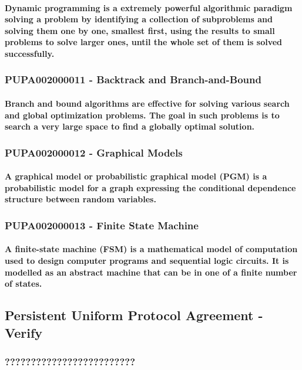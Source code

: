 \documentclass{acm_proc_article-sp}
\begin{document}
\paragraph{Dynamic programming is a extremely powerful algorithmic paradigm solving a problem by identifying a collection of subproblems and solving them one by one, smallest first, using the results to small problems to solve larger ones, until the whole set of them is solved successfully.}
\subsubsection{PUPA002000011 - Backtrack and Branch-and-Bound}
\paragraph{Branch and bound algorithms are effective for solving various search and global optimization problems. The goal in such problems is to search a very large space to find a globally optimal solution.}
\subsubsection{PUPA002000012 - Graphical Models}
\paragraph{A graphical model or probabilistic graphical model (PGM) is a probabilistic model for a graph expressing the conditional dependence structure between random variables.}
\subsubsection{PUPA002000013 - Finite State Machine}
\paragraph{A finite-state machine (FSM) is a mathematical model of computation used to design computer programs and sequential logic circuits. It is modelled as an abstract machine that can be in one of a finite number of states.}
\subsection{Persistent Uniform Protocol Agreement - Verify}
\subsubsection{?????????????????????????}
\end{document}
